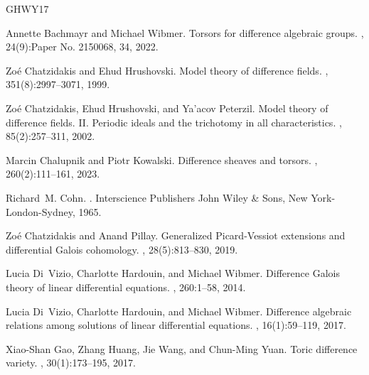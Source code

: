 \documentclass[oneside,reqno]{amsart}
\theoremstyle{definition}
\newcommand{\ab}[1]{\todo[inline,color=blue!20!white]{\textbf{Annette:} #1}}
\begin{document}






\def\cprime{$'$}
\begin{thebibliography}{GHWY17}

Annette Bachmayr and Michael Wibmer.
\newblock Torsors for difference algebraic groups.
, 24(9):Paper No. 2150068, 34, 2022.

Zo{\'e} Chatzidakis and Ehud Hrushovski.
\newblock Model theory of difference fields.
, 351(8):2997--3071, 1999.

Zo{\'e} Chatzidakis, Ehud Hrushovski, and Ya'acov Peterzil.
\newblock Model theory of difference fields. {II}. {P}eriodic ideals and the
  trichotomy in all characteristics.
, 85(2):257--311, 2002.

Marcin Chalupnik and Piotr Kowalski.
\newblock Difference sheaves and torsors.
, 260(2):111--161, 2023.

Richard~M. Cohn.
.
\newblock Interscience Publishers John Wiley \& Sons, New York-London-Sydney,
  1965.

Zo\'e{} Chatzidakis and Anand Pillay.
\newblock Generalized {P}icard-{V}essiot extensions and differential {G}alois
  cohomology.
, 28(5):813--830, 2019.

Lucia Di~Vizio, Charlotte Hardouin, and Michael Wibmer.
\newblock Difference {G}alois theory of linear differential equations.
, 260:1--58, 2014.

Lucia Di~Vizio, Charlotte Hardouin, and Michael Wibmer.
\newblock Difference algebraic relations among solutions of linear differential
  equations.
, 16(1):59--119, 2017.

Xiao-Shan Gao, Zhang Huang, Jie Wang, and Chun-Ming Yuan.
\newblock Toric difference variety.
, 30(1):173--195, 2017.


\end{thebibliography}
\end{document}
